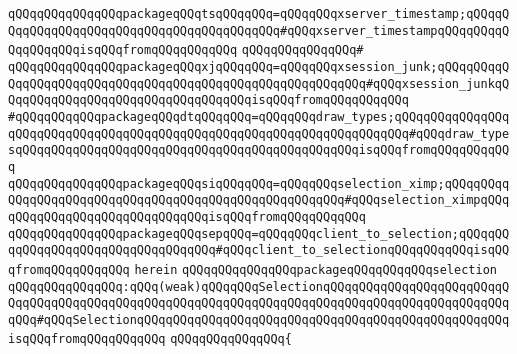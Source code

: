 \verb|qQQqqQQqqQQqqQQqpackageqQQqtsqQQqqQQq=qQQqqQQqxserver_timestamp;qQQqqQQqqQQqqQQqqQQqqQQqqQQqqQQqqQQqqQQqqQQq#qQQqxserver_timestampqQQqqQQqqQQqqQQqqQQqisqQQqfromqQQqqQQqqQQq|\newline
\verb|qQQqqQQqqQQqqQQq#|\newline
\verb|qQQqqQQqqQQqqQQqpackageqQQqxjqQQqqQQq=qQQqqQQqxsession_junk;qQQqqQQqqQQqqQQqqQQqqQQqqQQqqQQqqQQqqQQqqQQqqQQqqQQqqQQqqQQq#qQQqxsession_junkqQQqqQQqqQQqqQQqqQQqqQQqqQQqqQQqqQQqisqQQqfromqQQqqQQqqQQq|\newline
\verb|#qQQqqQQqqQQqpackageqQQqdtqQQqqQQq=qQQqqQQqdraw_types;qQQqqQQqqQQqqQQqqQQqqQQqqQQqqQQqqQQqqQQqqQQqqQQqqQQqqQQqqQQqqQQqqQQqqQQq#qQQqdraw_typesqQQqqQQqqQQqqQQqqQQqqQQqqQQqqQQqqQQqqQQqqQQqqQQqisqQQqfromqQQqqQQqqQQq|\newline
\verb|qQQqqQQqqQQqqQQqpackageqQQqsiqQQqqQQq=qQQqqQQqselection_ximp;qQQqqQQqqQQqqQQqqQQqqQQqqQQqqQQqqQQqqQQqqQQqqQQqqQQqqQQq#qQQqselection_ximpqQQqqQQqqQQqqQQqqQQqqQQqqQQqqQQqisqQQqfromqQQqqQQqqQQq|\newline
\verb|qQQqqQQqqQQqqQQqpackageqQQqsepqQQq=qQQqqQQqclient_to_selection;qQQqqQQqqQQqqQQqqQQqqQQqqQQqqQQqqQQq#qQQqclient_to_selectionqQQqqQQqqQQqisqQQqfromqQQqqQQqqQQq|\newline
\verb|herein|\newline
\newline
\newline
\verb|qQQqqQQqqQQqqQQqpackageqQQqqQQqqQQqselection|\newline
\verb|qQQqqQQqqQQqqQQq:qQQq(weak)qQQqqQQqSelectionqQQqqQQqqQQqqQQqqQQqqQQqqQQqqQQqqQQqqQQqqQQqqQQqqQQqqQQqqQQqqQQqqQQqqQQqqQQqqQQqqQQqqQQqqQQqqQQqqQQq#qQQqSelectionqQQqqQQqqQQqqQQqqQQqqQQqqQQqqQQqqQQqqQQqqQQqqQQqqQQqisqQQqfromqQQqqQQqqQQq|\newline
\verb|qQQqqQQqqQQqqQQq{|\newline

